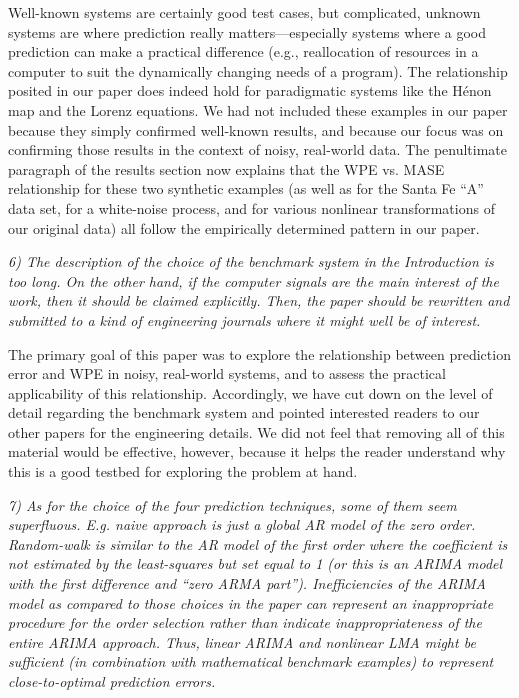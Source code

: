 \documentclass[12pt]{article}
\begin{document}
Well-known systems are certainly good test cases, but complicated,
unknown systems are where prediction really matters---especially
systems where a good prediction can make a practical difference (e.g.,
reallocation of resources in a computer to suit the dynamically
changing needs of a program).  The relationship posited in our paper
does indeed hold for paradigmatic systems like the H\'{e}non map and
the Lorenz equations.  We had not included these examples in our paper
because they simply confirmed well-known results, and because our
focus was on confirming those results in the context of noisy,
real-world data.  The penultimate paragraph of the results section now
explains that the WPE vs. MASE relationship for these two synthetic
examples (as well as for the Santa Fe ``A'' data set, for a
white-noise process, and for various nonlinear transformations of our
original data) all follow the empirically determined pattern in our
paper.

\smallskip

\emph{6) The description of the choice of the benchmark system in the
  Introduction is too long. On the other hand, if the computer signals
  are the main interest of the work, then it should be claimed
  explicitly. Then, the paper should be rewritten and submitted to a
  kind of engineering journals where it might well be of interest.}

The primary goal of this paper was to explore the relationship between
prediction error and WPE in noisy, real-world systems, and to assess
the practical applicability of this relationship.  Accordingly, we
have cut down on the level of detail regarding the benchmark system
and pointed interested readers to our other papers for the engineering
details.  We did not feel that removing all of this material would be
effective, however, because it helps the reader understand why this is
a good testbed for exploring the problem at hand.

\smallskip

\emph{7) As for the choice of the four prediction techniques, some of
  them seem superfluous. E.g. naive approach is just a global AR model
  of the zero order.  Random-walk is similar to the AR model of the
  first order where the coefficient is not estimated by the
  least-squares but set equal to 1 (or this is an ARIMA model with the
  first difference and ``zero ARMA part''). Inefficiencies of the
  ARIMA model as compared to those choices in the paper can represent
  an inappropriate procedure for the order selection rather than
  indicate inappropriateness of the entire ARIMA approach. Thus,
  linear ARIMA and nonlinear LMA might be sufficient (in combination
  with mathematical benchmark examples) to represent close-to-optimal
  prediction errors.}
\end{document}
